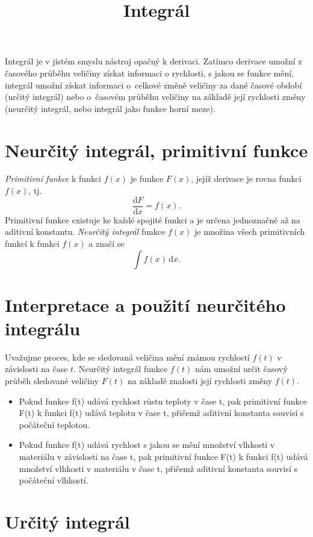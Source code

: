 \documentclass[11pt, reqno]{amsart}
\begin{document}
\title{Integrál}
\maketitle
\thispagestyle{empty}


Integrál je v jistém smyslu nástroj opačný k derivaci. Zatímco derivace umožní z časového průběhu veličiny
získat informaci o rychlosti, s jakou se funkce mění, integrál umožní získat informaci o~celkové změně veličiny
za dané časové období (určitý integrál) nebo o~časovém průběhu veličiny na základě její rychlosti změny (neurčitý integrál, nebo integrál jako funkce horní meze).

\section*{Neurčitý integrál, primitivní funkce}

{\itshape Primitivní funkce} k funkci $f(x)$ je funkce $F(x)$, jejíž derivace je rovna funkci $f(x)$, tj. 
\[\frac{\mathrm dF}{\mathrm dx} = f(x). \tag{1}\] 
Primitivní funkce existuje ke každé spojité funkci a je určena jednoznačně až na aditivní konstantu.
{\itshape Neurčitý integrál} funkce $f(x)$ je množina všech primitivních funkcí k funkci $f(x)$ a značí se
\[\int f(x) \,\mathrm dx.\]

\section*{Interpretace a použití neurčitého integrálu}

Uvažujme proces, kde se sledovaná veličina mění známou rychlostí $f(t)$ v závislosti na čase $t$.
Neurčitý integrál funkce $f(t)$ nám umožní určit časový průběh sledované veličiny $F(t)$ na základě znalosti její rychlosti změny $f(t)$.

\begin{itemize}
  \item 
Pokud funkce f(t) udává rychlost růstu teploty v čase t, pak primitivní funkce
F(t) k funkci f(t)
 udává teplotu v čase t, přičemž aditivní konstanta souvisí s počáteční teplotou.
\item
Pokud funkce f(t) udává rychlost s jakou se mění množství vlhkosti v materiálu v závislosti  
na čase t, pak primitivní funkce F(t) k funkci f(t) udává množství vlhkosti v materiálu v čase t,
přičemž aditivní konstanta souvisí s počáteční vlhkostí.
\end{itemize}

\section*{Určitý integrál}
\end{document}

